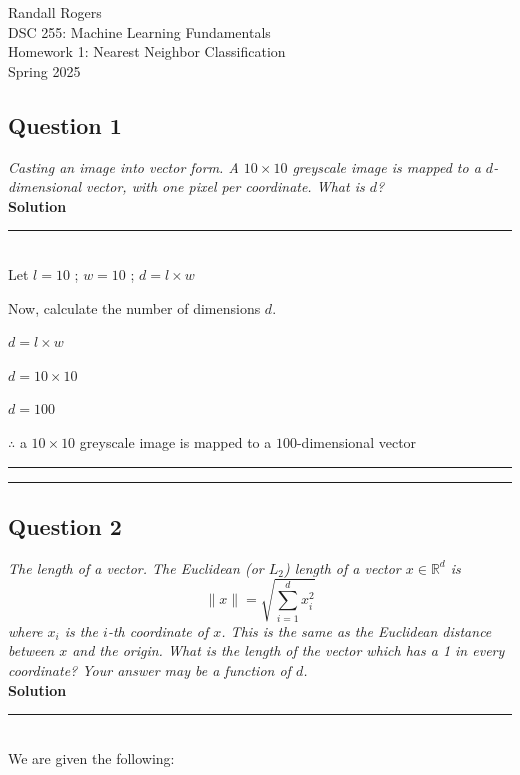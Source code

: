\documentclass{article}
\begin{document}
\begin{flushright}
   Randall Rogers\\
   DSC 255: Machine Learning Fundamentals\\
   Homework 1: Nearest Neighbor Classification\\
   Spring 2025 \\
\end{flushright}

\subsection*{Question 1}
\textit{Casting an image into vector form. A $10 \times 10$ greyscale image is mapped to a $d$-dimensional vector, with one pixel per coordinate. What is $d$?}\\

\textbf{Solution} 

\noindent\rule{\textwidth}{0.4pt}\\

Let $l = 10$ ; $w = 10$ ; $d = l \times w$

Now, calculate the number of dimensions $d$.

$d = l \times w$

$d = 10 \times 10$

$d = 100$
   
$\therefore$ a $10 \times 10$ greyscale image is mapped to a $100$-dimensional vector\\

\noindent\rule{\textwidth}{0.4pt}
\noindent\rule{\textwidth}{0.4pt}

\subsection*{Question 2}

\textit{The length of a vector. The Euclidean (or $L_2$) length of a vector $x \in \mathbb{R}^d$ is}
$$
\|x\| = \sqrt{\sum_{i=1}^{d} x_i^2}
$$
\textit{where $x_i$ is the $i$-th coordinate of $x$. This is the same as the Euclidean distance between $x$ and the origin. What is the length of the vector which has a 1 in every coordinate? Your answer may be a function of $d$.}\\

\textbf{Solution} 

\noindent\rule{\textwidth}{0.4pt}\\

We are given the following:
   
\end{document}
